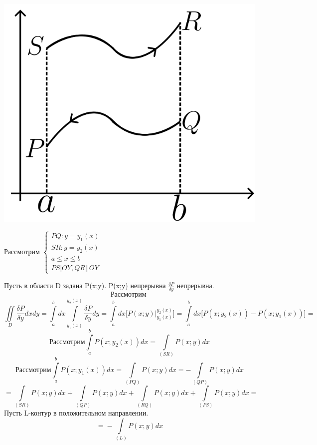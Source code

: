 \documentclass[12pt]{article}
\let\ORIincludegraphics\includegraphics
\renewcommand{\includegraphics}[2][]{\ORIincludegraphics[scale=0.65,#1]{#2}}
\let\oldint\int
\let\oldiint\iint
\renewcommand{\int}{\oldint\limits}
\renewcommand{\iint}{\oldiint\limits}
\begin{document}
  \begin{minipage}{0.45\textwidth}
    \includegraphics[scale=0.6]{8.15.2.png}
  \end{minipage}
  \hspace{1em}
  \begin{minipage}{0.55\textwidth}
    Рассмотрим 
    $\begin{cases}
      PQ:y=y_1(x)\\
      SR: y=y_2(x)\\
      a\leq x \leq b\\
      PS|OY, QR||OY
    \end{cases}$\\
  \end{minipage}
  \vspace{1em}
  \par
  Пусть в области D задана P(x;y). P(x;y) непрерывна $\frac{\delta P}{\delta y}$ непрерывна.
  \[\text{Рассмотрим }\] \[ \iint_D \frac{\delta P}{\delta y}dxdy= 
  \int_{a}^{b}dx \int_{y_1(x)}^{y_2(x)} \frac{\delta P}{\delta y}dy=
  \int_{a}^{b}dx \Big[P(x;y)\Big|_{y_1(x)}^{y_2(x)}\Big]=
  \int_{a}^{b}dx \Big[P(x;y_2(x))-P(x;y_1(x))\Big] \boxed{=}\]
  \[\text{Рассмотрим} \int_{a}^{b}P(x;y_2(x))dx=\int_{(SR)}P(x;y)dx\]
  \[\text{Рассмотрим} \int_{a}^{b}P(x;y_1(x))dx=\int_{(PQ)}P(x;y)dx=-\int_{(QP)}P(x;y)dx\]
  \[\boxed{=} \int_{(SR)}P(x;y)dx +\int_{(QP)}P(x;y)dx+\int_{(RQ)}P(x;y)dx+\int_{(PS)}P(x;y)dx \boxed{=}\]
  Пусть L-контур в положительном направлении.
  \[\boxed{=} - \int_{(L)}P(x;y)dx\]\\
\end{document}

